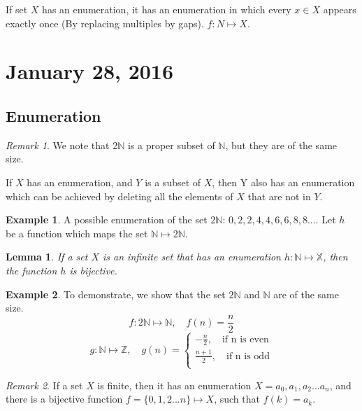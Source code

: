 \documentclass[11pt]{article}
\theoremstyle{plain} %
\newtheorem*{lemma}{Lemma}
\theoremstyle{definition}
\theoremstyle{example}
\newtheorem*{example}{Example}
\theoremstyle{remark}
\newtheorem*{remark}{Remark}
\begin{document}
If set $X$ has an enumeration, it has an enumeration in which every $x \in X$ appears exactly once (By replacing multiples by gaps). $f:N \mapsto X$.




\section{January 28, 2016}
\subsection{Enumeration}

\begin{remark}
We note that 2$\mathbb N$ is a proper subset of $\mathbb N$, but they are of the same size.
\end{remark}

If $X$ has an enumeration, and $Y$ is a subset of $X$, then Y also has an enumeration which can be achieved by deleting all the elements of $X$ that are not in $Y$.

\begin{example}
A possible enumeration of the set $2\mathbb N$: $0,2,2,4,4,6,6,8,8...$. Let $h$ be a function which maps the set $\mathbb N \mapsto 2\mathbb N$.
\end{example}

\begin{lemma}
If a set $X$ is an infinite set that has an enumeration $h: \mathbb N \mapsto \mathbb X$, then the function $h$ is bijective.
\end{lemma}

\begin{example}
To demonstrate, we show that the set $2 \mathbb N$ and $\mathbb N$ are of the same size.
$$f: 2 \mathbb N \mapsto \mathbb N, \quad f(n) = \frac{n}{2}$$
\[  g: \mathbb N \mapsto \mathbb Z, \quad g(n) =\begin{cases}
    -\frac{n}{2}, \quad \text{if n is even} \\
   \frac{n+1}{2},\quad \text{if n is odd}\\
  \end{cases}
\]

\end{example}

\begin{remark}
If a set $X$ is finite, then it has an enumeration $X = {a_0, a_1, a_2...a_n}$, and there is a bijective function $f = \{0,1,2...n\} \mapsto X$, such that $f(k)= a_k$.
\end{remark}
\end{document}
